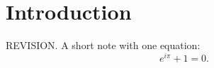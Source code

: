 \documentclass{article}
\begin{document}
\section{Introduction}
REVISION. A short note with one equation:
\begin{equation}
  e^{i\pi} + 1 = 0.
\end{equation}
\end{document}
